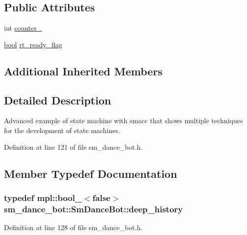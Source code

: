 \subsection*{Public Attributes}
\begin{DoxyCompactItemize}
\item 
int \hyperlink{structsm__dance__bot_1_1SmDanceBot_ab3b8db557ce94d34c60b291911eb140c}{counter\+\_}
\item 
\hyperlink{classbool}{bool} \hyperlink{structsm__dance__bot_1_1SmDanceBot_a0f0587a13670ad8925555cd8f6cb6b2d}{rt\+\_\+ready\+\_\+flag}
\end{DoxyCompactItemize}
\subsection*{Additional Inherited Members}


\subsection{Detailed Description}
Advanced example of state machine with smacc that shows multiple techniques for the development of state machines. 

Definition at line 121 of file sm\+\_\+dance\+\_\+bot.\+h.



\subsection{Member Typedef Documentation}
\subsubsection[{\texorpdfstring{deep\+\_\+history}{deep_history}}]{\setlength{\rightskip}{0pt plus 5cm}typedef mpl\+::bool\+\_\+$<$false$>$ {\bf sm\+\_\+dance\+\_\+bot\+::\+Sm\+Dance\+Bot\+::deep\+\_\+history}}\hypertarget{structsm__dance__bot_1_1SmDanceBot_abd58ec4a2b50a45da304a5f0b9c44706}{}\label{structsm__dance__bot_1_1SmDanceBot_abd58ec4a2b50a45da304a5f0b9c44706}


Definition at line 128 of file sm\+\_\+dance\+\_\+bot.\+h.

